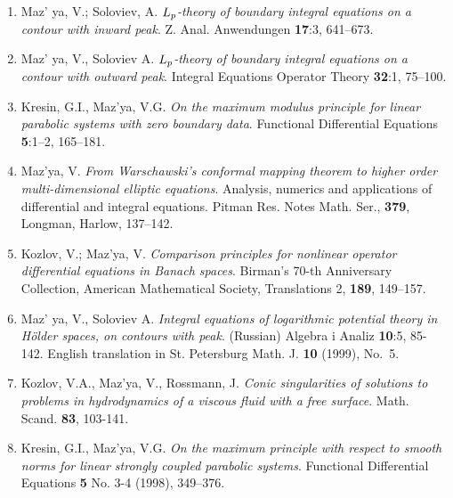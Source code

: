\documentclass{article}
\begin{document}
\begin{enumerate}
{\bf 1998}
\item Maz' ya, V.; Soloviev, A. {\it $L\sb p$-theory of boundary
integral
equations on a contour with inward peak}. Z. Anal.
Anwendungen {\bf 17}:3, 641--673.
\item Maz' ya, V., Soloviev A. {\it $L\sb p$-theory of boundary
integral
equations on a contour with outward peak}. Integral
Equations Operator Theory {\bf 32}:1, 75--100.
\item Kresin, G.I., Maz'ya, V.G. {\it On the maximum modulus principle
for
linear parabolic systems with zero boundary data}.
Functional Differential Equations {\bf 5}:1--2, 165--181.
\item Maz'ya, V. {\it From Warschawski's conformal mapping theorem to
higher order multi-dimensional elliptic equations}. Analysis,
numerics and applications of differential and integral equations.
Pitman
Res. Notes Math. Ser., {\bf 379}, Longman, Harlow,
137--142.
\item Kozlov, V.; Maz'ya, V. {\it Comparison principles for nonlinear
operator differential equations in Banach spaces}. Birman's
70-th Anniversary Collection, American Mathematical Society,
Translations
2, {\bf 189}, 149--157.
\item Maz' ya, V., Soloviev A. {\it Integral equations of logarithmic
potential theory in H\"older spaces, on contours with peak}.
(Russian) Algebra i Analiz {\bf 10}:5, 85-142.
English translation in St. Petersburg Math. J. \textbf{10} (1999),
No.~5.
\item Kozlov, V.A., Maz'ya, V., Rossmann, J. {\it Conic singularities
of
     solutions to problems in hydrodynamics of a viscous fluid with a
free
     surface}. Math. Scand. {\bf 83}, 103-141.
\item Kresin, G.I., Maz'ya, V.G. {\it On the maximum principle with
respect to smooth norms for linear strongly coupled
parabolic systems}. Functional Differential Equations \textbf{5} No.
3-4
(1998), 349--376.
\hfill\break


\end{enumerate}
\end{document}
